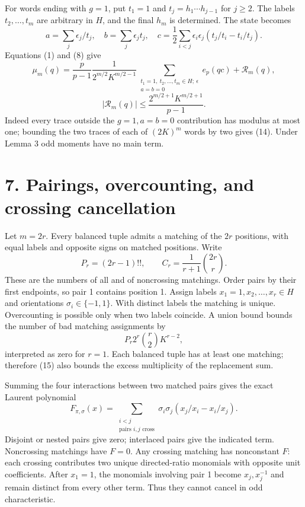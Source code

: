 \documentclass[
  11pt,
]{article}
\begin{document}
For words ending with \(g=1\), put \(t_1=1\) and
\(t_j=h_1\cdots h_{j-1}\) for \(j\geq2\). The labels \(t_2,\ldots,t_m\)
are arbitrary in \(H\), and the final \(h_m\) is determined. The state
becomes \[
 a=\sum_j\epsilon_j/t_j,\quad b=\sum_j\epsilon_jt_j,\quad
 c=\frac12\sum_{i<j}\epsilon_i\epsilon_j(t_j/t_i-t_i/t_j).
\] Equations (1) and (8) give \[
 \mu_m(q)=\frac{p}{p-1}\frac{1}{2^{m/2}K^{m/2-1}}
 \sum_{\substack{t_1=1,\ t_2,\ldots,t_m\in H;\ \epsilon\\a=b=0}}
 e_p(qc)+\mathcal R_m(q), \tag{13}
\] \[
 |\mathcal R_m(q)|\leq\frac{2^{m/2+1}K^{m/2+1}}{p-1}. \tag{14}
\] Indeed every trace outside the \(g=1,a=b=0\) contribution has modulus
at most one; bounding the two traces of each of \((2K)^m\) words by two
gives (14). Under Lemma 3 odd moments have no main term.

\hypertarget{pairings-overcounting-and-crossing-cancellation}{%
\section{7. Pairings, overcounting, and crossing
cancellation}\label{pairings-overcounting-and-crossing-cancellation}}

Let \(m=2r\). Every balanced tuple admits a matching of the \(2r\)
positions, with equal labels and opposite signs on matched positions.
Write \[
 P_r=(2r-1)!!,\qquad C_r=\frac1{r+1}\binom{2r}{r}.
\] These are the numbers of all and of noncrossing matchings. Order
pairs by their first endpoints, so pair 1 contains position 1. Assign
labels \(x_1=1,x_2,\ldots,x_r\in H\) and orientations
\(\sigma_i\in\{-1,1\}\). With distinct labels the matching is unique.
Overcounting is possible only when two labels coincide. A union bound
bounds the number of bad matching assignments by \[
 P_r2^r\binom r2 K^{r-2}, \tag{15}
\] interpreted as zero for \(r=1\). Each balanced tuple has at least one
matching; therefore (15) also bounds the excess multiplicity of the
replacement sum.

Summing the four interactions between two matched pairs gives the exact
Laurent polynomial \[
 F_{\pi,\sigma}(x)=\sum_{\substack{i<j\\\text{pairs }i,j\text{ cross}}}
 \sigma_i\sigma_j(x_j/x_i-x_i/x_j). \tag{16}
\] Disjoint or nested pairs give zero; interlaced pairs give the
indicated term. Noncrossing matchings have \(F=0\). Any crossing
matching has nonconstant \(F\): each crossing contributes two unique
directed-ratio monomials with opposite unit coefficients. After
\(x_1=1\), the monomials involving pair 1 become \(x_j,x_j^{-1}\) and
remain distinct from every other term. Thus they cannot cancel in odd
characteristic.
\end{document}
